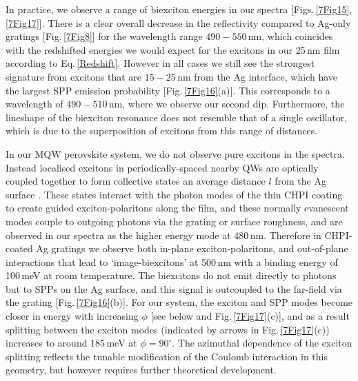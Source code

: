In practice, we observe a range of biexciton energies in our spectra [Figs.\,\ref{7Fig15},\ref{7Fig17}]. There is a clear overall decrease in the reflectivity compared to Ag-only gratings [Fig.\,\ref{7Fig8}] for the wavelength range $490-550$\,nm, which coincides with the redshifted energies we would expect for the excitons in our 25\,nm film according to Eq.\,\ref{Redshift}. However in all cases we still see the strongest signature from excitons that are $15-25$\,nm from the Ag interface, which have the largest SPP emission probability [Fig.\,\ref{7Fig16}(a)]. This corresponds to a wavelength of $490-510$\,nm, where we observe our second dip. Furthermore, the lineshape of the biexciton resonance does not resemble that of a single oscillator, which is due to the superposition of excitons from this range of distances. %

In our MQW perovskite system, we do not observe pure excitons in the spectra. Instead localised excitons in periodically-spaced nearby QWs are optically coupled together to form collective states an average distance $l$ from the Ag surface \cite{Pbbr2008, Baumberg1998, Kavokin1998, Vladimirova1998}. These states interact with the photon modes of the thin CHPI coating to create guided exciton-polaritons along the film, and these normally evanescent modes couple to outgoing photons via the grating or surface roughness, and are observed in our spectra as the higher energy mode at 480\,nm. %
Therefore in CHPI-coated Ag gratings we observe both in-plane exciton-polaritons, and out-of-plane interactions that lead to `image-biexcitons' %
at 500\,nm with a binding energy of 100\,meV at room temperature. The biexcitons do not emit directly to photons but to SPPs on the Ag surface, and this signal is outcoupled to the far-field via the grating [Fig.\,\ref{7Fig16}(b)]. %
For our system, the exciton and SPP modes become closer in energy with increasing $\phi$ [see below and Fig.\,\ref{7Fig17}(c)], and as a result splitting between the exciton modes (indicated by arrows in Fig.\,\ref{7Fig17}(c)) increases to around 185\,meV at $\phi=90^{\circ}$. The azimuthal dependence of the exciton splitting reflects the tunable modification of the Coulomb interaction in this geometry, but however requires further theoretical development.

